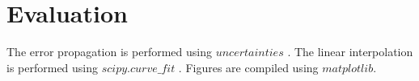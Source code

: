 \section{Evaluation}
\label{sec:auswertung}


The error propagation is performed using $uncertainties$ \cite{uncertainties}. The linear interpolation is performed using $scipy.curve\_fit$ \cite{scipy}.
Figures are compiled using $matplotlib$\cite{matplotlib}. 
%